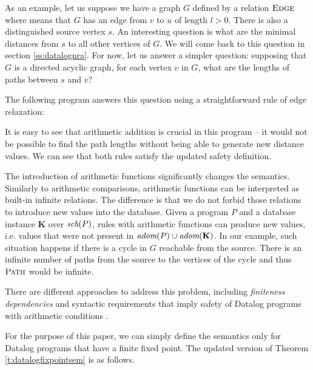\begin{exmp}

As an example, let us suppose we have a graph $G$ defined by a relation $\textsc{Edge}$ 
where  means that $G$ has an edge from $v$ to $u$ of length $l > 0$. 
There is also a distinguished source vertex $s$.
An interesting question is what are the minimal distances from $s$ to all other vertices of $G$.
We will come back to this question in section \ref{ss:datalognra}.
For now, let us answer a simpler question: supposing that $G$ is a directed acyclic graph, for each vertex $v$ in $G$,
what are the lengths of paths between $s$ and $v$?

The following program answers this question using a straightforward rule of edge relaxation:


It is easy to see that arithmetic addition is crucial in this program -- it would not be possible to find the path lengths without being able to generate new distance values. We can see that both rules satisfy the updated safety definition.
\end{exmp}

The introduction of arithmetic functions significantly changes the semantics.
Similarly to arithmetic comparisons, arithmetic functions can be interpreted as built-in infinite relations. 
The difference is that we do not forbid those relations to introduce new values into the database.
Given a program $P$ and a database instance $\textbf{K}$ over $\textit{sch}(P)$, rules with arithmetic functions can produce new values, i.e. values that were not present in $\textit{adom}(P) \cup \textit{adom}(\textbf{K})$. In our example, such situation happens if there is a cycle in $G$ reachable from the source. There is an infinite number of paths from the source to the vertices of the cycle and thus $\textsc{Path}$ would be infinite.

There are different approaches to address this problem, including \emph{finiteness dependencies} and syntactic requirements that imply safety of Datalog programs with arithmetic conditions \cite{RBS87, KRS88a, KRS88b, SV89}.

For the purpose of this paper, we can simply define the semantics only for Datalog programs that have a finite fixed point. The updated version of Theorem \ref{t:datalogfixpointsem} is as follows. 

